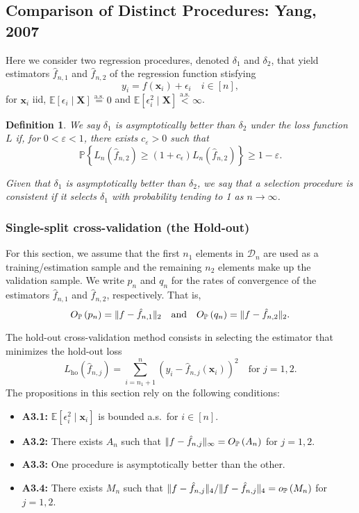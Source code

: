 \documentclass[12pt, letter paper]{article}
\newcommand{\1}{\mathmybb{1}}
\newtheorem{definition}{Definition}[section]
\newcommand{\0}{\emptyset}
\newcommand{\prob}{\mathbb{P}}
\newcommand{\Ep}[1]{\mathbb{E}\left[ #1 \right]}
\newcommand{\paren}[1]{\left(#1 \right)}
\newcommand{\set}[1]{\left\{ #1 \right\}}
\newcommand{\norm}[1]{|\hspace{-1pt}|#1 |\hspace{-1pt}|}
\newcommand{\data}{\mathcal{D}_{n}}
\newcommand{\aseq}{\stackrel{\mathrm{a.s.}}{=}}
\newcommand{\X}{\boldsymbol{X}}
\newcommand{\x}{\boldsymbol{x}}
\newcommand{\Loss}[1]{L_{n}\paren{#1}}
\newcommand{\op}[1]{o_{\prob}\paren{#1}}
\newcommand{\Op}[1]{O_{\prob}\paren{#1}}
\newcommand{\fhat}[2]{\hat{f}_{#1, #2}}
\begin{document}
\subsection{Comparison of Distinct Procedures: Yang, 2007}

Here we consider two regression procedures, denoted \(\delta_{1}\) and \(\delta_{2}\), that yield estimators \(\hat{f}_{n, 1}\) and \(\hat{f}_{n, 2}\) of the regression function stisfying
\begin{equation}\label{eq:regressionmodel}
    y_{i} = f(\x_{i}) + \epsilon_{i}\quad i\in[n],
\end{equation}
for \(\x_{i}\) iid, \(\Ep{\epsilon_{i}\mid \X} \aseq 0\) and \(\Ep{\epsilon_{i}^{2}\mid \X} \stackrel{\text{a.s.}}{<} \infty\).

\begin{definition}
    We say \(\delta_{1}\) is \emph{asymptotically better} than \(\delta_{2}\) under the loss function \(L\) if, for \(0<\varepsilon<1\), there exists \(c_{\varepsilon}>0\) such that
    \[\prob\set{\Loss{\fhat{n}{2}}\geq (1+c_{\epsilon})\Loss{\fhat{n}{2}} }\geq 1-\varepsilon.\]

    Given that \(\delta_{1}\) is asymptotically better than \(\delta_{2}\), we say that a selection procedure is consistent if it selects \(\delta_{1}\) with probability tending to 1 as \(n\to\infty\).
\end{definition}


\subsubsection{Single-split cross-validation (the Hold-out)}

For this section, we assume that the first \(n_1\) elements in \(\data\) are used as a training/estimation sample and the remaining \(n_2\) elements make up the validation sample. We write \(p_{n}\) and \(q_{n}\) for the rates of convergence of the estimators \(\fhat{n}{1}\) and \(\fhat{n}{2}\), respectively. That is,
\[\Op{p_{n}} = \norm{f - \fhat{n}{1}}_{2}\quad\text{and}\quad \Op{q_{n}} = \norm{f- \fhat{n}{2}}_{2}.\]

The hold-out cross-validation method consists in selecting the estimator that minimizes the hold-out loss
\[L_{\mathrm{ho}}(\fhat{n}{j}) = \sum_{i=n_{1}+1}^{n}\paren{y_{i} - \fhat{n}{j}(\x_{i})}^{2}\quad\text{for }j=1,2.\]
The propositions in this section rely on the following conditions:
\begin{itemize}
    \item \textbf{A3.1:} \(\Ep{\epsilon_{i}^{2}\mid \x_{i}}\) is bounded a.s.\ for \(i\in[n]\).
    \item \textbf{A3.2:} There exists \(A_{n}\) such that \(\norm{f-\fhat{n}{j}}_{\infty} = \Op{A_{n}}\) for \(j=1,2\).
    \item \textbf{A3.3:} One procedure is asymptotically better than the other.
    \item \textbf{A3.4:} There exists \(M_{n}\) such that \(\norm{f-\fhat{n}{j}}_{4} / \norm{f-\fhat{n}{j}}_{4} = \op{M_{n}}\) for \(j=1,2\).
\end{itemize}
\end{document}
